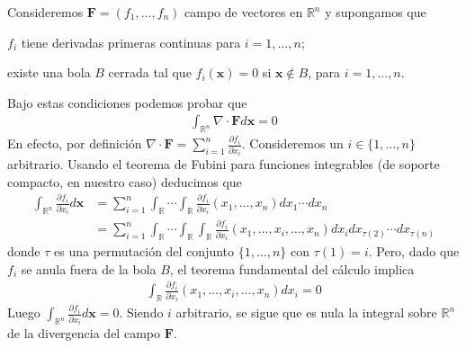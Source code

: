\documentclass{report}
\newcommand{\realNumbers}{\mathbb{R}}
\theoremstyle{definition}
\theoremstyle{remark}
\begin{document}
  Consideremos \(\mathbf{F} = (f_1, \dots, f_n)\) campo de vectores en \(\realNumbers^n\) y supongamos que
  \begin{enumerate*}
    \item \(f_i\) tiene derivadas primeras continuas para \(i = 1, \dots, n\);
    \item existe una bola \(B\) cerrada tal que \(f_i(\mathbf{x}) = 0\) si \(\mathbf{x} \notin B\), para \(i = 1, \dots, n\).
  \end{enumerate*}
  Bajo estas condiciones podemos probar que 
  \begin{align}
    \label{equation:compactlySupportedFieldsHaveNullTotalDivergence}
    \int_{\realNumbers^n} \nabla \cdot \mathbf{F} d \mathbf{x} = 0
  \end{align}
  En efecto, por definición
  \(
    \nabla \cdot \mathbf{F}
    =
    \sum_{i = 1}^n
    \frac{\partial f_i}{\partial x_i}
  \).
  Consideremos un \(i \in \{1, \dots, n\}\) arbitrario.
  Usando el teorema de Fubini para funciones integrables (de soporte compacto, en nuestro caso) deducimos que
  \begin{align}
    \int_{\realNumbers^n} \frac{\partial f_i}{\partial x_i} d \mathbf{x}
    &=
    \sum_{i = 1}^n
    \int_{\realNumbers} \cdots \int_{\realNumbers}
      \frac{\partial f_i}{\partial x_i}(x_1, \dots, x_n)
    dx_1 \cdots dx_n
    \\
    \label{equation:integralsCanBePermutedBecauseOfCompactSupport}
    &=
    \sum_{i = 1}^n
    \int_{\realNumbers} \cdots \int_{\realNumbers} \int_{\realNumbers}
      \frac{\partial f_i}{\partial x_i}(x_1, \dots, x_i, \dots, x_n)
    dx_{i} dx_{\tau(2)} \cdots dx_{\tau(n)}
  \end{align}
  donde \(\tau\) es una permutación del conjunto \(\{1, \dots, n\}\) con \(\tau(1) = i\).
  Pero, dado que \(f_i\) se anula fuera de la bola \(B\), el teorema fundamental del cálculo implica
  \begin{align}
    \label{equation:integralIsNullBecauseOfCompactSupport}
    \int_{\realNumbers}
      \frac{\partial f_i}{\partial x_i}(x_1, \dots, x_i, \dots, x_n)
    dx_{i}
    =
    0
  \end{align}
  Luego \(\int_{\realNumbers^n} \frac{\partial f_i}{\partial x_i} d \mathbf{x} = 0\).
  Siendo \(i\) arbitrario, se sigue que es nula la integral sobre \(\realNumbers^n\) de la divergencia del campo \(\mathbf{F}\).
  
\end{document}
